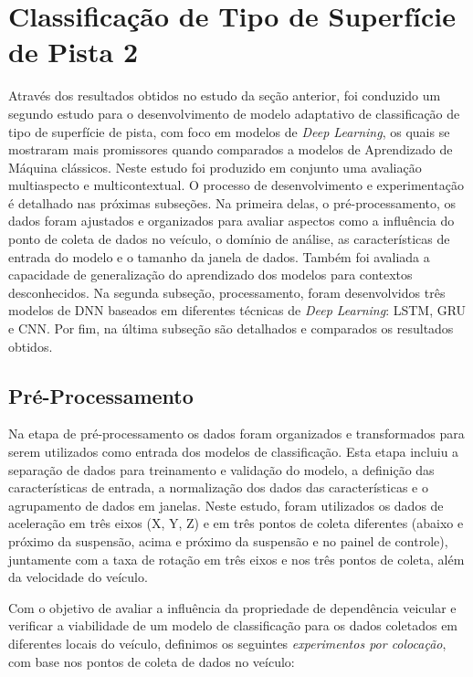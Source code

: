 \chapter{Classificação de Tipo de Superfície de Pista 2}
\label{cap:classificacao_tipo_superficie_2}

Através dos resultados obtidos no estudo da seção anterior, foi conduzido um segundo estudo para o desenvolvimento de modelo adaptativo de classificação de tipo de superfície de pista, com foco em modelos de \textit{Deep Learning}, os quais se mostraram mais promissores quando comparados a modelos de Aprendizado de Máquina clássicos. Neste estudo foi produzido em conjunto uma avaliação multiaspecto e multicontextual. O processo de desenvolvimento e experimentação é detalhado nas próximas subseções. Na primeira delas, o pré-processamento, os dados foram ajustados e organizados para avaliar aspectos como a influência do ponto de coleta de dados no veículo, o domínio de análise, as características de entrada do modelo e o tamanho da janela de dados. Também foi avaliada a capacidade de generalização do aprendizado dos modelos para contextos desconhecidos. Na segunda subseção, processamento, foram desenvolvidos três modelos de DNN baseados em diferentes técnicas de \textit{Deep Learning}: LSTM, GRU e CNN. Por fim, na última subseção são detalhados e comparados os resultados obtidos.

\section{Pré-Processamento}

Na etapa de pré-processamento os dados foram organizados e transformados para serem utilizados como entrada dos modelos de classificação. Esta etapa incluiu a separação de dados para treinamento e validação do modelo, a definição das características de entrada, a normalização dos dados das características e o agrupamento de dados em janelas. Neste estudo, foram utilizados os dados de aceleração em três eixos (X, Y, Z) e em três pontos de coleta diferentes (abaixo e próximo da suspensão, acima e próximo da suspensão e no painel de controle), juntamente com a taxa de rotação em três eixos e nos três pontos de coleta, além da velocidade do veículo.

Com o objetivo de avaliar a influência da propriedade de dependência veicular e verificar a viabilidade de um modelo de classificação para os dados coletados em diferentes locais do veículo, definimos os seguintes \emph{experimentos por colocação}, com base nos pontos de coleta de dados no veículo:

